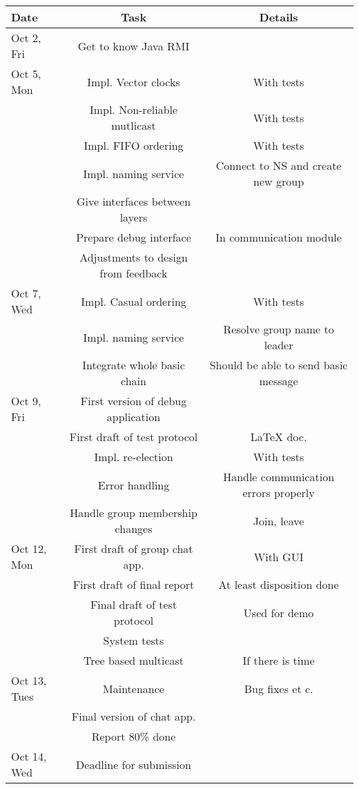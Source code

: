 		\begin{tabular}{lcc}
			\centering
			\textbf{Date} & \textbf{Task} & \textbf{Details} \\
			\hline
			Oct 2, Fri & Get to know Java RMI \\
			\hline
			Oct 5, Mon & Impl. Vector clocks & With tests \\
			& Impl. Non-reliable mutlicast & With tests \\
			& Impl. FIFO ordering & With tests \\
			& Impl. naming service & Connect to NS and create new group \\
			& Give interfaces between layers &  \\
			& Prepare debug interface & In communication module \\
			& Adjustments to design from feedback & \\
			\hline
			Oct 7, Wed & Impl. Casual ordering & With tests \\
			& Impl. naming service & Resolve group name to leader \\
			& Integrate whole basic chain & Should be able to send basic message \\
			\hline
			Oct 9, Fri & First version of debug application &  \\
			& First draft of test protocol & LaTeX doc. \\
			& Impl. re-election & With tests \\
			& Error handling & Handle communication errors properly \\
			& Handle group membership changes & Join, leave \\
			\hline
			Oct 12, Mon & First draft of group chat app. & With GUI \\
			& First draft of final report & At least disposition done \\
			& Final draft of test protocol & Used for demo \\
			& System tests & \\
			& Tree based multicast & If there is time \\
			\hline
			Oct 13, Tues & Maintenance & Bug fixes et c.\\
			& Final version of chat app. & \\
			& Report 80\% done & \\
			\hline
			Oct 14, Wed & Deadline for submission & \\

		\end{tabular}

